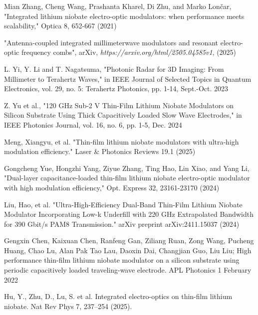 \documentclass[thesis]{deutez}
\begin{document}
\begin{thebibliography}{30}
         Mian Zhang, Cheng Wang, Prashanta Kharel, Di Zhu, and Marko Lončar, "Integrated lithium niobate electro-optic modulators: when performance meets scalability," Optica 8, 652-667 (2021) 
	
	
		  "Antenna-coupled integrated millimeterwave modulators and resonant electro-optic frequency combs", arXiv, \textit{https://arxiv.org/html/2505.04585v1}, (2025)
		
		 L. Yi, Y. Li and T. Nagatsuma, "Photonic Radar for 3D Imaging: From Millimeter to Terahertz Waves," in IEEE Journal of Selected Topics in Quantum Electronics, vol. 29, no. 5: Terahertz Photonics, pp. 1-14, Sept.-Oct. 2023
		
		 Z. Yu et al., "120 GHz Sub-2 V Thin-Film Lithium Niobate Modulators on Silicon Substrate Using Thick Capacitively Loaded Slow Wave Electrodes," in IEEE Photonics Journal, vol. 16, no. 6, pp. 1-5, Dec. 2024
		
		 Meng, Xiangyu, et al. "Thin‐film lithium niobate modulators with ultra‐high modulation efficiency." Laser \& Photonics Reviews 19.1 (2025)		
		
		 Gongcheng Yue, Hongzhi Yang, Ziyue Zhang, Ting Hao, Lin Xiao, and Yang Li, "Dual-layer capacitance-loaded thin-film lithium niobate electro-optic modulator with high modulation efficiency," Opt. Express 32, 23161-23170 (2024)
		
		 Liu, Hao, et al. "Ultra-High-Efficiency Dual-Band Thin-Film Lithium Niobate Modulator Incorporating Low-k Underfill with 220 GHz Extrapolated Bandwidth for 390 Gbit/s PAM8 Transmission." arXiv preprint arXiv:2411.15037 (2024)
		
		 Gengxin Chen, Kaixuan Chen, Ranfeng Gan, Ziliang Ruan, Zong Wang, Pucheng Huang, Chao Lu, Alan Pak Tao Lau, Daoxin Dai, Changjian Guo, Liu Liu; High performance thin-film lithium niobate modulator on a silicon substrate using periodic capacitively loaded traveling-wave electrode. APL Photonics 1 February 2022
		
		 Hu, Y., Zhu, D., Lu, S. et al. Integrated electro-optics on thin-film lithium niobate. Nat Rev Phys 7, 237–254 (2025).
		\end{thebibliography}
\end{document}
